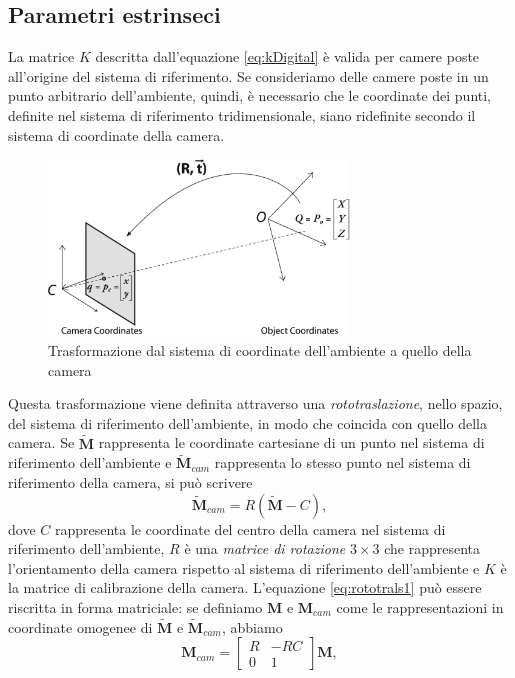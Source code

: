  \subsection{Parametri estrinseci}
 La matrice $K$ descritta dall'equazione \eqref{eq:kDigital} \`e valida per camere poste all'origine del sistema di riferimento.
Se consideriamo delle camere poste in un punto arbitrario dell'ambiente, quindi, \`e necessario che le coordinate dei punti, definite nel sistema di riferimento tridimensionale, siano ridefinite secondo il sistema di coordinate della camera.
 \begin{figure}[tb]
 	\centering
 	\includegraphics[width=8cm]{./pictures/rt}
 	\caption{Trasformazione dal sistema di coordinate dell'ambiente a quello della camera}
 	\label{fig:rt}
 \end{figure}
Questa trasformazione viene definita attraverso una \textit{rototraslazione}, nello spazio, del sistema di riferimento dell'ambiente, in modo che coincida con quello della camera.
Se $\tilde{\textbf{M}}$ rappresenta le coordinate cartesiane di un punto nel sistema di riferimento dell'ambiente e $\tilde{\textbf{M}}_{cam}$ rappresenta lo stesso punto nel sistema di riferimento della camera, si pu\`o scrivere
\begin{equation}
\label{eq:rototrals1}
\tilde{\textbf{M}}_{cam}=R(\tilde{\textbf{M}} - C),
\end{equation}
dove $C$ rappresenta le coordinate del centro della camera nel sistema di riferimento dell'ambiente, $R$ \`e una \textit{matrice di rotazione} $3 \times 3$ che rappresenta l'orientamento della camera rispetto al sistema di riferimento dell'ambiente e $K$ \`e la matrice di calibrazione della camera.
L'equazione \eqref{eq:rototrals1} pu\`o essere riscritta in forma matriciale: se definiamo $\textbf{M}$ e $\textbf{M}_{cam}$ come le rappresentazioni in coordinate omogenee di $\tilde{\textbf{M}}$ e $\tilde{\textbf{M}}_{cam}$, abbiamo
\[ \textbf{M}_{cam} =  \left[\begin{array}{cc}
R & -RC \\
0 & 1
\end{array}\right] 
\textbf{M}, \]
